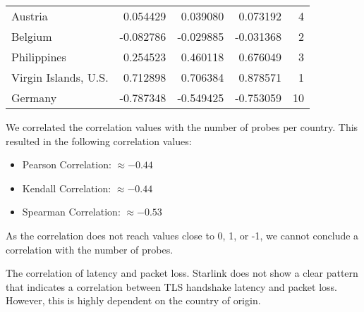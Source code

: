 \begin{table}[ht]
\begin{tabular}{lrrrr}
		Austria               & 0.054429    & 0.039080    & 0.073192    & 4         \\
		Belgium               & -0.082786   & -0.029885   & -0.031368   & 2         \\
		Philippines           & 0.254523    & 0.460118    & 0.676049    & 3         \\
		Virgin Islands, U.S.  & 0.712898    & 0.706384    & 0.878571    & 1         \\
		Germany               & -0.787348   & -0.549425   & -0.753059   & 10        \\
		\bottomrule
	\end{tabular}
\end{table}

We correlated the correlation values with the number of probes per country.
This resulted in the following correlation values:

\begin{itemize}
	\item Pearson Correlation: $\approx -0.44$
	\item Kendall Correlation: $\approx -0.44$
	\item Spearman Correlation: $\approx -0.53$
\end{itemize}

As the correlation does not reach values close to 0, 1, or -1, we cannot
conclude a correlation with the number of probes.

\begin{takeaway}{The correlation of latency and packet loss.}
	Starlink does not show a clear pattern that indicates a correlation
	between TLS handshake latency and packet loss. However, this is highly
	dependent on the country of origin.
\end{takeaway}
